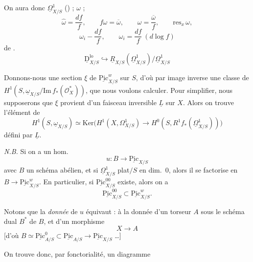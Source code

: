 \documentclass[11pt,a4paper]{article}
\begin{document}
On aura donc  $\underline{\Omega}^1_{X/S}$ (\ill{}) ; $\omega$ ;
\[
  \widehat{\omega} = \frac{df}{f}, \qquad f\omega = \overline{\omega}, \qquad \omega = \frac{\overline{\omega}}{f}, \qquad \mathrm{res}_x\, \omega,
\]
\[
  \omega_i - \frac{df}{f}, \qquad \omega_i = \frac{df}{f} \ (d \log f)
\]
  de \ill{}.
\[
  \underline{\mathrm{D}}^{\mathrm{lo}}_{X/S} \hookrightarrow \underline{R}_{X/S}(\underline{\Omega}^1_{X/S})/\underline{\Omega}^1_{X/S}
\]

Donnons-nous une section \struck{\ill{}} $\xi$ de $\underline{\mathrm{Pic}}^{w}_{X/S}$ sur $S$, d'où par image inverse une classe de $H^1(S, \underline{\omega}_{X/S}/\mathrm{Im}\, f_*(\mathcal{O}_X^*))$, que nous voulons calculer. Pour simplifier, nous  supposerons que $\xi$ provient d'un faisceau inversible $\underline{L}$ sur $X$. Alors on trouve   l'élément de
\[
  H^1(S, \underline{\omega}_{X/S}) \simeq \mathrm{Ker}\bigl(H^1(X, \Omega^1_{X/S}) \to H^0(S, R^1f_*(\underline{\Omega}^1_{X/S}))\bigr)
\]
défini par $\underline{L}$.

\emph{N.B.} Si on a un hom.
\[
  u : B \to \underline{\mathrm{Pic}}_{X/S}
\]
avec $B$ un schéma abélien, et si $\underline{\Omega}^1_{X/S}$  plat$/S$ en dim.\ $0$, alors il se factorise en $B \to \underline{\mathrm{Pic}}^{w}_{X/S}$. En particulier, si $\underline{\mathrm{Pic}}^{00}_{X/S}$ existe, alors on a
\[
  \underline{\mathrm{Pic}}^{00}_{X/S} \subset \underline{\mathrm{Pic}}^{w}_{X/S}.
\]

Notons que la \emph{donnée} de $u$ équivaut : à la donnée d'un torseur $A$ sous  le schéma dual $B^*$ de $B$, et d'un morphisme
\[
  X \longrightarrow A
\]
[d'où $B \simeq \underline{\mathrm{Pic}}^{0}_{A/S} \subset \underline{\mathrm{Pic}}_{A/S} \to \underline{\mathrm{Pic}}_{X/S}$ …]

On trouve donc, par fonctorialité, un diagramme

\end{document}
